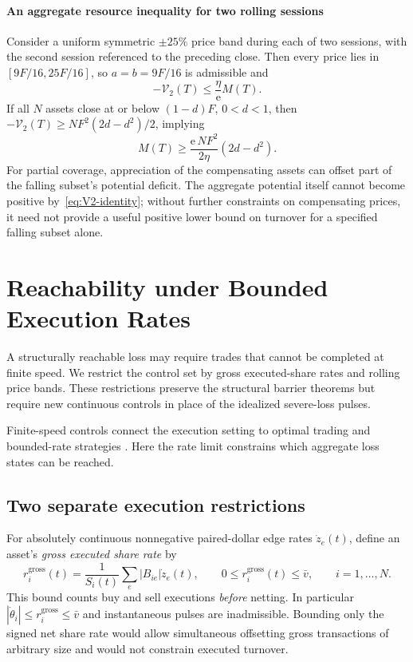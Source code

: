 \documentclass[review,hidelinks,onefignum,onetabnum]{siamonline250211}
\begin{document}
\paragraph{An aggregate resource inequality for two rolling sessions}
Consider a uniform symmetric $\pm25\%$ price band during each of two
sessions, with the second session referenced to the preceding close.
Then every price lies in
$[9F/16,25F/16]$, so $a=b=9F/16$ is admissible and
\[
-\mathcal V_2(T)\le\frac{\eta}{\mathrm e}M(T).
\]
If all $N$ assets close at or below $(1-d)F$, $0<d<1$, then
$-\mathcal V_2(T)\ge NF^2(2d-d^2)/2$, implying
\[
M(T)\ge\frac{\mathrm e\,NF^2}{2\eta}(2d-d^2).
\]
For partial coverage, appreciation of the compensating assets can
offset part of the falling subset's potential deficit. The aggregate
potential itself cannot become positive by~\eqref{eq:V2-identity};
without further constraints on compensating prices, it need not
provide a useful positive lower bound on turnover for a specified
falling subset alone.


\section{Reachability under Bounded Execution Rates}\label{sec:rateband}
A structurally reachable loss may require trades that cannot be completed at finite speed. We restrict the control set by gross executed-share rates and rolling price bands. These restrictions preserve the structural barrier theorems but require new continuous controls in place of the idealized severe-loss pulses.

Finite-speed controls connect the execution setting to optimal trading and bounded-rate strategies \citep{AlmgrenChriss2001,Yang2019}. Here the rate limit constrains which aggregate loss states can be reached.

\subsection{Two separate execution restrictions}\label{subsec:execution-restrictions}
For absolutely continuous nonnegative paired-dollar edge rates $\dot z_e(t)$, define an asset's \emph{gross executed share rate} by
\begin{equation}\label{eq:grossrate}
 r_i^{\mathrm{gross}}(t)=\frac{1}{S_i(t)}\sum_e |B_{ie}|\dot z_e(t),\qquad
 0\le r_i^{\mathrm{gross}}(t)\le\bar v,\qquad i=1,\ldots,N.
\end{equation}
This bound counts buy and sell executions \emph{before} netting. In particular $|\dot\theta_i|\le r_i^{\mathrm{gross}}\le\bar v$ and instantaneous pulses are inadmissible. Bounding only the signed net share rate would allow simultaneous offsetting gross transactions of arbitrary size and would not constrain executed turnover.
\end{document}
